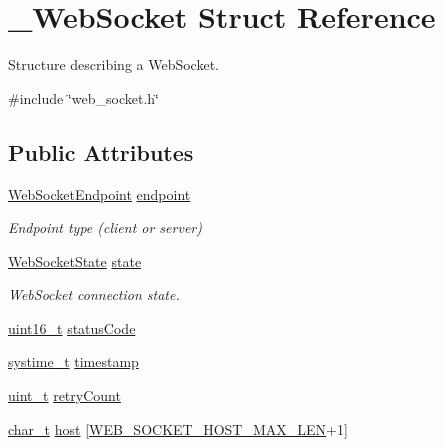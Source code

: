 \hypertarget{struct__WebSocket}{}\section{\+\_\+\+Web\+Socket Struct Reference}
\label{struct__WebSocket}


Structure describing a Web\+Socket.  




{\ttfamily \#include \char`\"{}web\+\_\+socket.\+h\char`\"{}}

\subsection*{Public Attributes}
\begin{DoxyCompactItemize}
\item 
\hyperlink{web__socket_8h_ae7d51561abe243c4f263d6c7d50699a9}{Web\+Socket\+Endpoint} \hyperlink{struct__WebSocket_af7727957641cc1977418f2de501c92cf}{endpoint}
\begin{DoxyCompactList}\small\item\em Endpoint type (client or server) \end{DoxyCompactList}\item 
\hyperlink{web__socket_8h_a84047dc3e004de841d87c90be9dcd0f0}{Web\+Socket\+State} \hyperlink{struct__WebSocket_aa865e4c0ffd2c25b2f0ed29217d29c4c}{state}
\begin{DoxyCompactList}\small\item\em Web\+Socket connection state. \end{DoxyCompactList}\item 
\hyperlink{stdint_8h_a273cf69d639a59973b6019625df33e30}{uint16\+\_\+t} \hyperlink{struct__WebSocket_a25418037440af5779aa43da69eb091fd}{status\+Code}
\item 
\hyperlink{compiler__port_8h_ae3e32a98d431a02106616da3071832dd}{systime\+\_\+t} \hyperlink{struct__WebSocket_a3f80a5666d9dfca72b23169f5ea43a76}{timestamp}
\item 
\hyperlink{compiler__port_8h_a12a1e9b3ce141648783a82445d02b58d}{uint\+\_\+t} \hyperlink{struct__WebSocket_a35ff726c380bf014810fa42fa0df10eb}{retry\+Count}
\item 
\hyperlink{compiler__port_8h_a40bb5262bf908c328fbcfbe5d29d0201}{char\+\_\+t} \hyperlink{struct__WebSocket_ad7852664f96e591e8b4a31283dfa0852}{host} \mbox{[}\hyperlink{web__socket_8h_ab0e0a872efe7a6badc10953d0fc24cd0}{W\+E\+B\+\_\+\+S\+O\+C\+K\+E\+T\+\_\+\+H\+O\+S\+T\+\_\+\+M\+A\+X\+\_\+\+L\+EN}+1\mbox{]}

\end{DoxyCompactItemize}
